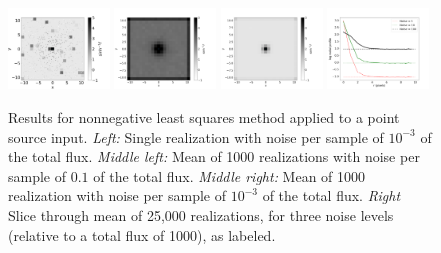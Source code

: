\documentclass[twocolumn,tighten]{aastex61}
\begin{document}
\begin{figure}[t!]
\centering
\includegraphics[width=0.24\textwidth, angle=0]
                {figures/scattered-nnls-noisy.png}
\includegraphics[width=0.24\textwidth, angle=0]
                {figures/scattered-nnls-mean-100.png}
\includegraphics[width=0.24\textwidth, angle=0]
                {figures/scattered-nnls-mean-1.png}
\includegraphics[width=0.24\textwidth, angle=0]
                {figures/scattered-nnls-mean-profile.png}
\caption{ \label{fig:scattered-nnls} Results for nonnegative least
  squares method applied to a point source input. {\it Left:} Single
  realization with noise per sample of $10^{-3}$ of the total
  flux. {\it Middle left:} Mean of 1000 realizations with noise per
  sample of $0.1$ of the total flux. {\it Middle right:} Mean of 1000
  realization with noise per sample of $10^{-3}$ of the total
  flux. {\it Right} Slice through mean of 25,000 realizations, for
  three noise levels (relative to a total flux of 1000), as labeled.}
\end{figure} 
\end{document}
